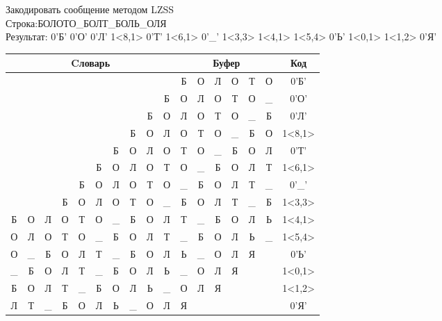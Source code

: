 \documentclass[a4paper, 12pt]{article}
\begin{document}
Закодировать сообщение методом LZSS\\
Строка:БОЛОТО\_БОЛТ\_БОЛЬ\_ОЛЯ\\
Результат: 0'Б' 0'О' 0'Л' 1<8,1> 0'Т' 1<6,1> 0'\_' 1<3,3> 1<4,1> 1<5,4> 0'Ь' 1<0,1> 1<1,2> 0'Я'\\
\begin{table}[h!]
\centering
\begin{tabular}{|c|c|c|c|c|c|c|c|c|c|c|c|c|c|c|c|c|}
\hline
\multicolumn{10}{|c|}{Cловарь} & \multicolumn{6}{c|}{Буфер} & Код  \\ \hline
  &   &   &   &   &   &   &   &   &   & Б & О & Л & О & Т & О & 0'Б'\\ \hline
  &   &   &   &   &   &   &   &   & Б & О & Л & О & Т & О & \_ & 0'О'\\ \hline
  &   &   &   &   &   &   &   & Б & О & Л & О & Т & О & \_ & Б & 0'Л'\\ \hline
  &   &   &   &   &   &   & Б & \cellcolor[HTML]{FFFF00} О & Л & \cellcolor[HTML]{FFFF00} О & Т & О & \_ & Б & О & 1<8,1>\\ \hline
  &   &   &   &   &   & Б & О & Л & О & Т & О & \_ & Б & О & Л & 0'Т'\\ \hline
  &   &   &   &   & Б & \cellcolor[HTML]{FFFF00} О & Л & О & Т & \cellcolor[HTML]{FFFF00} О & \_ & Б & О & Л & Т & 1<6,1>\\ \hline
  &   &   &   & Б & О & Л & О & Т & О & \_ & Б & О & Л & Т & \_ & 0'\_'\\ \hline
  &   &   & \cellcolor[HTML]{FFFF00} Б & \cellcolor[HTML]{FFFF00} О & \cellcolor[HTML]{FFFF00} Л & О & Т & О & \_ & \cellcolor[HTML]{FFFF00} Б & \cellcolor[HTML]{FFFF00} О & \cellcolor[HTML]{FFFF00} Л & Т & \_ & Б & 1<3,3>\\ \hline
Б & О & Л & О & \cellcolor[HTML]{FFFF00} Т & О & \_ & Б & О & Л & \cellcolor[HTML]{FFFF00} Т & \_ & Б & О & Л & Ь & 1<4,1>\\ \hline
О & Л & О & Т & О & \cellcolor[HTML]{FFFF00} \_ & \cellcolor[HTML]{FFFF00} Б & \cellcolor[HTML]{FFFF00} О & \cellcolor[HTML]{FFFF00} Л & Т & \cellcolor[HTML]{FFFF00} \_ & \cellcolor[HTML]{FFFF00} Б & \cellcolor[HTML]{FFFF00} О & \cellcolor[HTML]{FFFF00} Л & Ь & \_ & 1<5,4>\\ \hline
О & \_ & Б & О & Л & Т & \_ & Б & О & Л & Ь & \_ & О & Л & Я &   & 0'Ь'\\ \hline
\cellcolor[HTML]{FFFF00} \_ & Б & О & Л & Т & \_ & Б & О & Л & Ь & \cellcolor[HTML]{FFFF00} \_ & О & Л & Я &   &   & 1<0,1>\\ \hline
Б & \cellcolor[HTML]{FFFF00} О & \cellcolor[HTML]{FFFF00} Л & Т & \_ & Б & О & Л & Ь & \_ & \cellcolor[HTML]{FFFF00} О & \cellcolor[HTML]{FFFF00} Л & Я &   &   &   & 1<1,2>\\ \hline
Л & Т & \_ & Б & О & Л & Ь & \_ & О & Л & Я &   &   &   &   &   & 0'Я'\\ \hline
\end{tabular}
\end{table}
\end{document}
